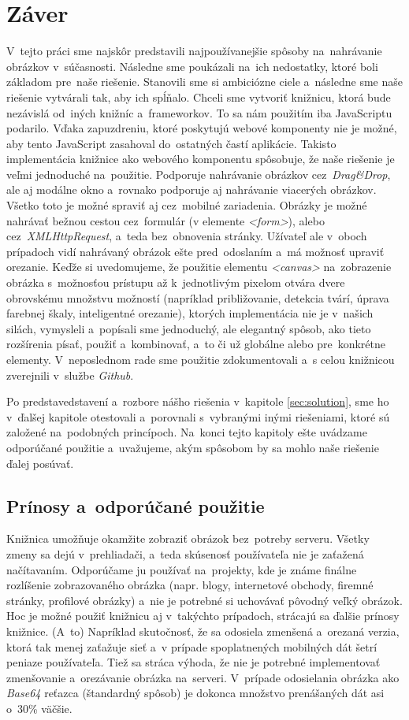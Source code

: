 \chapter{Záver}
V~tejto práci sme najskôr predstavili najpoužívanejšie spôsoby na~nahrávanie obrázkov v~súčasnosti. Následne sme poukázali na~ich nedostatky, ktoré boli základom pre~naše riešenie. Stanovili sme si ambiciózne ciele a~následne sme naše riešenie vytvárali tak, aby ich spĺňalo.
Chceli sme vytvoriť knižnicu, ktorá bude nezávislá od~iných knižníc a~frameworkov. To sa nám použitím iba JavaScriptu podarilo. Vďaka zapuzdreniu, ktoré poskytujú webové komponenty nie je možné, aby tento JavaScript zasahoval do~ostatných častí aplikácie. Takisto implementácia knižnice ako webového  komponentu spôsobuje, že naše riešenie je veľmi jednoduché na~použitie.
Podporuje nahrávanie obrázkov cez~\emph{Drag\&Drop}, ale aj modálne okno a~rovnako podporuje aj nahrávanie viacerých obrázkov. Všetko toto je možné spraviť aj cez~mobilné zariadenia. Obrázky je možné nahrávať bežnou cestou cez~formulár (v elemente \emph{<form>}), alebo cez~\emph{XMLHttpRequest}, a~teda bez~obnovenia stránky. Užívateľ ale v~oboch prípadoch vidí nahrávaný obrázok ešte pred~odoslaním a~má možnosť upraviť orezanie.
Keďže si uvedomujeme, že použitie elementu \emph{<canvas>} na~zobrazenie obrázka s~možnosťou prístupu až k~jednotlivým pixelom otvára dvere obrovskému množstvu možností (napríklad približovanie, detekcia tvárí, úprava farebnej škaly, inteligentné orezanie), ktorých implementácia nie je v~našich silách, vymysleli a~popísali sme jednoduchý, ale elegantný spôsob, ako tieto rozšírenia písať, použiť a~kombinovať, a~to či už globálne alebo pre~konkrétne elementy. V~neposlednom rade sme použitie zdokumentovali a~s celou knižnicou zverejnili v~službe \emph{Github}.

Po predstavedstavení a~rozbore nášho riešenia v~kapitole \ref{sec:solution}, sme ho v~ďalšej kapitole otestovali a~porovnali s~vybranými inými riešeniami, ktoré sú založené na~podobných princípoch. Na~konci tejto kapitoly ešte uvádzame odporúčané použitie a~uvažujeme, akým spôsobom by sa mohlo naše riešenie ďalej posúvať. 


\section{Prínosy a~odporúčané použitie}

Knižnica umožňuje okamžite zobraziť obrázok bez~potreby serveru. Všetky zmeny sa dejú v~prehliadači, a~teda skúsenosť používateľa nie je zaťažená načítavaním. Odporúčame ju používať na~projekty, kde je známe finálne rozlíšenie zobrazovaného obrázka (napr. blogy, internetové obchody, firemné stránky, profilové obrázky) a~nie je potrebné si uchovávať pôvodný veľký obrázok. Hoc je možné použiť knižnicu aj v~takýchto prípadoch, strácajú sa ďalšie prínosy knižnice. (A~to) Napríklad skutočnosť, že sa odosiela zmenšená a~orezaná verzia, ktorá tak menej zaťažuje sieť a~v prípade spoplatnených mobilných dát šetrí peniaze používateľa. Tiež sa stráca výhoda, že nie je potrebné implementovať zmenšovanie a~orezávanie obrázka na~serveri. V~prípade odosielania obrázka ako \emph{Base64} reťazca (štandardný spôsob) je dokonca množstvo prenášaných dát asi o~30\% väčšie.


